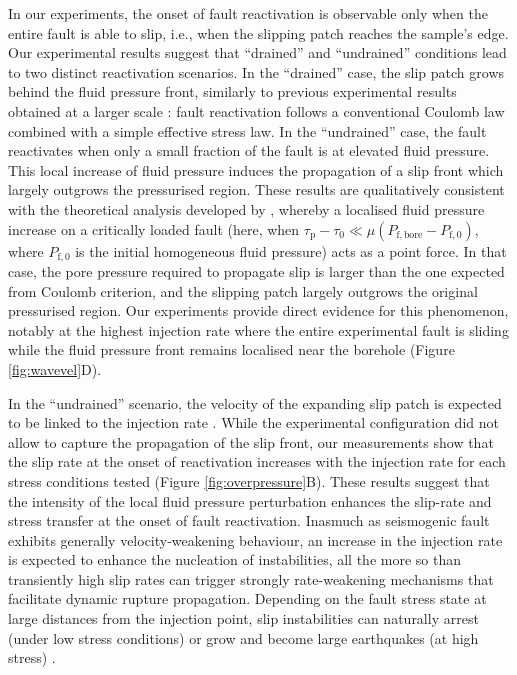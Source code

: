 \documentclass[grl]{agutex2arxiv}
\begin{document}
\begin{article}
In our experiments, the onset of fault reactivation is observable only when the entire fault is able to slip, i.e., when the slipping patch reaches the sample's edge. Our experimental results suggest that ``drained'' and ``undrained'' conditions lead to two distinct reactivation scenarios. In the ``drained'' case, the slip patch grows behind the fluid pressure front, similarly to previous experimental results obtained at a larger scale \citep{Guglielmi2015}: fault reactivation follows a conventional Coulomb law combined with a simple effective stress law. In the ``undrained'' case, the fault reactivates when only a small fraction of the fault is at elevated fluid pressure. This local increase of fluid pressure induces the propagation of a slip front which largely outgrows the pressurised region. These results are qualitatively consistent with the theoretical analysis developed by \cite{Garagash2012}, whereby a localised fluid pressure increase on a critically loaded fault (here, when $\tau_\mathrm{p}-\tau_0 \ll \mu(P_\mathrm{f,bore} - P_\mathrm{f,0})$, where $P_\mathrm{f,0}$ is the initial homogeneous fluid pressure) acts as a point force. In that case, the pore pressure required to propagate slip is larger than the one expected from Coulomb criterion, and the slipping patch largely outgrows the original pressurised region. Our experiments provide direct evidence for this phenomenon, notably at the highest injection rate where the entire experimental fault is sliding while the fluid pressure front remains localised near the borehole (Figure \ref{fig:wavevel}D). 

In the ``undrained'' scenario, the velocity of the expanding slip patch is expected to be linked to the injection rate \citep[e.g.,][]{Garagash2012,Dublanchet2017}. While the experimental configuration did not allow to capture the propagation of the slip front, our measurements show that the slip rate at the onset of reactivation increases with the injection rate for each stress conditions tested (Figure \ref{fig:overpressure}B). These results suggest that the intensity of the local fluid pressure perturbation enhances the slip-rate and stress transfer at the onset of fault reactivation. Inasmuch as seismogenic fault exhibits generally velocity-weakening behaviour, an increase in the injection rate is expected to enhance the nucleation of instabilities, all the more so than transiently high slip rates can trigger strongly rate-weakening mechanisms that facilitate dynamic rupture propagation. Depending on the fault stress state at large distances from the injection point, slip instabilities can naturally arrest (under low stress conditions) or grow and become large earthquakes (at high stress) \citep[e.g.,][]{Viesca2012,Garagash2012}. 


\end{article}
\end{document}
